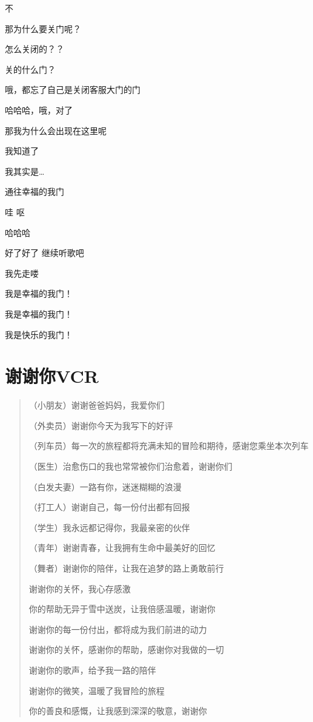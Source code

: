 \documentclass[]{ctexbook}
\begin{document}
不

那为什么要关门呢？

怎么关闭的？？

关的什么门？

哦，都忘了自己是关闭客服大门的门

哈哈哈，哦，对了

那我为什么会出现在这里呢

我知道了

我其实是\ldots{}

通往幸福的我门

哇 呕

哈哈哈

好了好了 继续听歌吧

我先走喽

我是幸福的我门！

我是幸福的我门！

我是快乐的我门！

\newpage

\section{谢谢你VCR}\label{thank-you-vcr}

\begin{quote}
（小朋友）谢谢爸爸妈妈，我爱你们

（外卖员）谢谢你今天为我写下的好评

（列车员）每一次的旅程都将充满未知的冒险和期待，感谢您乘坐本次列车

（医生）治愈伤口的我也常常被你们治愈着，谢谢你们

（白发夫妻）一路有你，迷迷糊糊的浪漫

（打工人）谢谢自己，每一份付出都有回报

（学生）我永远都记得你，我最亲密的伙伴

（青年）谢谢青春，让我拥有生命中最美好的回忆

（舞者）谢谢你的陪伴，让我在追梦的路上勇敢前行

谢谢你的关怀，我心存感激

你的帮助无异于雪中送炭，让我倍感温暖，谢谢你

谢谢你的每一份付出，都将成为我们前进的动力

谢谢你的关怀，感谢你的帮助，感谢你对我做的一切

谢谢你的歌声，给予我一路的陪伴

谢谢你的微笑，温暖了我冒险的旅程

你的善良和感慨，让我感到深深的敬意，谢谢你
\end{quote}
\end{document}
